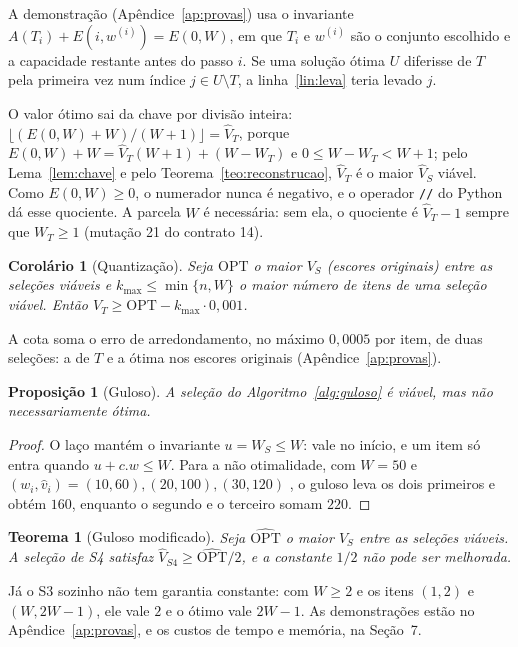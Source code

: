 \documentclass[11pt,a4paper]{article}
\theoremstyle{plain}
\newtheorem{teorema}{Teorema}
\newtheorem{proposicao}{Proposição}
\newtheorem{corolario}{Corolário}
\theoremstyle{definition}
\theoremstyle{plain}
\begin{document}
A demonstração (Apêndice~\ref{ap:provas}) usa o invariante
$A(T_i)+E(i,w^{(i)})=E(0,W)$, em que $T_i$ e $w^{(i)}$ são o conjunto escolhido e a
capacidade restante antes do passo $i$. Se uma solução ótima $U$ diferisse de $T$ pela
primeira vez num índice $j\in U\setminus T$, a linha~\ref{lin:leva} teria levado $j$.

O valor ótimo sai da chave por divisão inteira:
$\lfloor (E(0,W)+W)/(W+1)\rfloor=\hat{V}_T$, porque
$E(0,W)+W=\hat{V}_T(W+1)+(W-W_T)$ e $0\le W-W_T<W+1$; pelo Lema~\ref{lem:chave} e pelo
Teorema~\ref{teo:reconstrucao}, $\hat{V}_T$ é o maior $\hat{V}_S$ viável. Como
$E(0,W)\ge 0$, o numerador nunca é negativo, e o operador \texttt{//} do Python dá esse
quociente. A parcela $W$ é necessária: sem
ela, o quociente é $\hat{V}_T-1$ sempre que $W_T\ge 1$ (mutação 21 do contrato 14).

\begin{corolario}[Quantização]
\label{cor:quantizacao}
Seja $\mathrm{OPT}$ o maior $V_S$ (escores originais) entre as seleções viáveis e
$k_{\max}\le\min\{n,W\}$ o maior número de itens de uma seleção viável. Então
$V_T\ge \mathrm{OPT}-k_{\max}\cdot 0{,}001$.
\end{corolario}

A cota soma o erro de arredondamento, no máximo $0{,}0005$ por item, de duas seleções: a de
$T$ e a ótima nos escores originais (Apêndice~\ref{ap:provas}).

\begin{proposicao}[Guloso]
\label{prop:guloso}
A seleção do Algoritmo~\ref{alg:guloso} é viável, mas não necessariamente ótima.
\end{proposicao}

\begin{proof}
O laço mantém o invariante $u=W_S\le W$: vale no início, e um item só entra quando
$u+c.w\le W$. Para a não otimalidade, com $W=50$ e
$(w_i,\hat{v}_i)=(10,60),(20,100),(30,120)$ \cite{cormen2022introduction}, o guloso leva os
dois primeiros e obtém $160$, enquanto o segundo e o terceiro somam $220$.
\end{proof}

\begin{teorema}[Guloso modificado]
\label{teo:s4}
Seja $\widehat{\mathrm{OPT}}$ o maior $\hat{V}_S$ entre as seleções viáveis. A seleção de
S4 satisfaz $\hat{V}_{S4}\ge\widehat{\mathrm{OPT}}/2$, e a constante $1/2$ não pode ser
melhorada.
\end{teorema}

Já o S3 sozinho não tem garantia constante: com $W\ge 2$ e os itens $(1,2)$ e $(W,2W-1)$, ele vale
$2$ e o ótimo vale $2W-1$. As demonstrações estão no Apêndice~\ref{ap:provas}, e os custos
de tempo e memória, na Seção~7.
\end{document}
